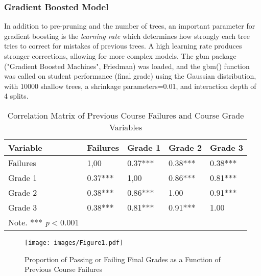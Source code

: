\documentclass[sigconf]{acmart}
\begin{document}
\subsubsection{Gradient Boosted Model} 

In addition to pre-pruning and the number of trees, an important parameter 
for gradient boosting is the \emph{learning rate} which determines how 
strongly each tree tries to correct for mistakes of previous trees. A high 
learning rate produces stronger corrections, allowing for more complex models. 
The gbm package ("Gradient Boosted Machines", Friedman) was loaded, and the 
gbm() function was called on student performance (final grade) using the 
Gaussian distribution, with 10000 shallow trees, a shrinkage parameters=0.01, 
and interaction depth of 4 splits. 


\begin{table}
  \caption{Correlation Matrix of Previous Course Failures and Course Grade 
  Variables}
  \label{tab:freq}
  \begin{tabular}{lllll}
    \toprule
    Variable    & Failures  & Grade 1 & Grade 2 & Grade 3  \\
    \midrule
    Failures    &  1,00     &  0.37***  & 0.38***   &  0.38***  \\
    Grade 1     &  0.37***  &  1,00     & 0.86***   &  0.81***  \\
    Grade 2     &  0.38***  &  0.86***  & 1.00      &  0.91***  \\  
    Grade 3     &  0.38***  &  0.81***  & 0.91***   &  1.00     \\    
    \bottomrule
    Note. *** \textit{p}$<$0.001 & & &
  \end{tabular}
\end{table}


\begin{figure}[!ht]
  \centering\texttt{[image: images/Figure1.pdf]}
  \caption{Proportion of Passing or Failing Final Grades as a 
  Function of Previous Course Failures}
  \label{f:Figure1}
\end{figure} 
 
 
\end{document}
